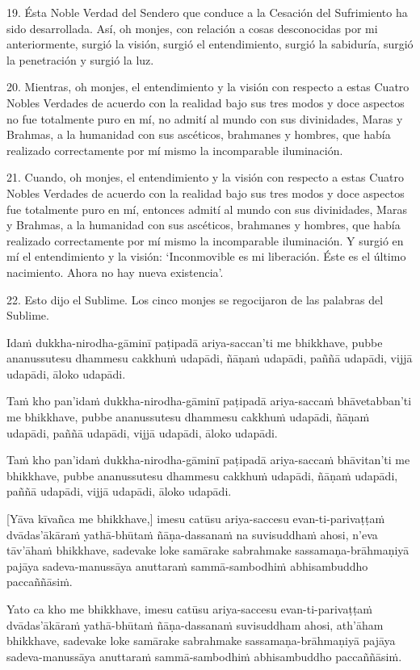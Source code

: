 19. Ésta Noble Verdad del Sendero que conduce a la Cesación del Sufrimiento ha sido desarrollada. Así, oh monjes, con relación a cosas desconocidas por mi anteriormente, surgió la visión, surgió el entendimiento, surgió la sabiduría, surgió la penetración y surgió la luz.

20. Mientras, oh monjes, el entendimiento y la visión con respecto a estas Cuatro Nobles Verdades de acuerdo con la realidad bajo sus tres modos y doce aspectos no fue totalmente puro en mí, no admití al mundo con sus divinidades, Maras y Brahmas, a la humanidad con sus ascéticos, brahmanes y hombres, que había realizado correctamente por mí mismo la incomparable iluminación.

21. Cuando, oh monjes, el entendimiento y la visión con respecto a estas Cuatro Nobles Verdades de acuerdo con la realidad bajo sus tres modos y doce aspectos fue totalmente puro en mí, entonces admití al mundo con sus divinidades, Maras y Brahmas, a la humanidad con sus ascéticos, brahmanes y hombres, que había realizado correctamente por mí mismo la incomparable iluminación. Y surgió en mí el entendimiento y la visión: ‘Inconmovible es mi liberación. Éste es el último nacimiento. Ahora no hay nueva existencia’.

22. Esto dijo el Sublime. Los cinco monjes se regocijaron de las palabras del Sublime.


\clearpage

\paliText
\markboth{\paliTitle}{\rightmark}

Idaṁ dukkha-nirodha-gāminī paṭipadā ariya-saccan'ti me bhikkhave, pubbe
ananussutesu dhammesu cakkhuṁ udapādi, ñāṇaṁ udapādi, paññā udapādi,
vijjā udapādi, āloko udapādi.

Taṁ kho pan'idaṁ dukkha-nirodha-gāminī paṭipadā ariya-saccaṁ bhāvetabban'ti
me bhikkhave, pubbe ananussutesu dhammesu cakkhuṁ udapādi, ñāṇaṁ
udapādi, paññā udapādi, vijjā udapādi, āloko udapādi.

Taṁ kho pan'idaṁ dukkha-nirodha-gāminī paṭipadā ariya-saccaṁ bhāvitan'ti me
bhikkhave, pubbe ananussutesu dhammesu cakkhuṁ udapādi, ñāṇaṁ udapādi,
paññā udapādi, vijjā udapādi, āloko udapādi.

[Yāva kīvañca me bhikkhave,] imesu catūsu ariya-saccesu evan-ti-parivaṭṭaṁ
dvādas'ākāraṁ yathā-bhūtaṁ ñāṇa-dassanaṁ na suvisuddhaṁ ahosi, n'eva tāv'āhaṁ
bhikkhave, sadevake loke samārake sabrahmake sassamaṇa-brāhmaṇiyā pajāya
sadeva-manussāya anuttaraṁ sammā-sambodhiṁ abhisambuddho paccaññāsiṁ.

Yato ca kho me bhikkhave, imesu catūsu ariya-saccesu evan-ti-parivaṭṭaṁ
dvādas'ākāraṁ yathā-bhūtaṁ ñāṇa-dassanaṁ suvisuddham ahosi, ath'āham
bhikkhave, sadevake loke samārake sabrahmake sassamaṇa-brāhmaṇiyā pajāya
sadeva-manussāya anuttaraṁ sammā-sambodhiṁ abhisambuddho paccaññāsiṁ.

